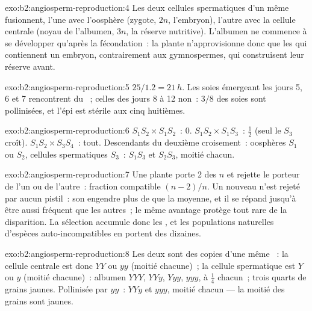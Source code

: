 \begin{solution}{exo:b2:angiosperm-reproduction:4}
Les deux cellules spermatiques d'un même  fusionnent,
l'une avec l'oosphère (zygote, $2n$, l'embryon), l'autre avec la cellule
centrale (noyau de l'albumen, $3n$, la réserve nutritive). L'albumen ne
commence à se développer qu'après la fécondation~: la plante
n'approvisionne donc que les  qui contiennent un embryon,
contrairement aux gymnospermes, qui construisent leur réserve avant.
\end{solution}

\begin{solution}{exo:b2:angiosperm-reproduction:5}
$25/1.2 = \qty{21}{h}$. Les soies émergeant les jours 5, 6 et 7
rencontrent du ~; celles des jours 8 à 12 non~: $3/8$ des soies
sont pollinisées, et l'épi est stérile aux cinq huitièmes.
\end{solution}

\begin{solution}{exo:b2:angiosperm-reproduction:6}
$S_1S_2\times S_1S_2$~: 0. $S_1S_2\times S_1S_3$~: $\tfrac12$ (seul le
 $S_3$ croît). $S_1S_2\times S_3S_4$~: tout. Descendants du
deuxième croisement~: oosphères $S_1$ ou $S_2$, cellules spermatiques
$S_3$~: $S_1S_3$ et $S_2S_3$, moitié chacun.
\end{solution}

\begin{solution}{exo:b2:angiosperm-reproduction:7}
Une plante porte 2 des $n$  et rejette le  porteur de l'un
ou de l'autre~: fraction compatible $(n - 2)/n$. Un  nouveau
n'est rejeté par aucun pistil~: son  engendre plus de  que
la moyenne, et il se répand jusqu'à être aussi fréquent que les autres~;
le même avantage protège tout  rare de la disparition. La
sélection accumule donc les , et les populations naturelles
d'espèces auto-incompatibles en portent des dizaines.
\end{solution}

\begin{solution}{exo:b2:angiosperm-reproduction:8}
Les deux  sont des copies d'une même ~: la
cellule centrale est donc $YY$ ou $yy$ (moitié chacune)~; la cellule
spermatique est $Y$ ou $y$ (moitié chacune)~: albumen $YYY$, $YYy$,
$Yyy$, $yyy$, à $\tfrac14$ chacun~; trois quarts de grains jaunes.
Pollinisée par $yy$~: $YYy$ et $yyy$, moitié chacun --- la moitié des
grains sont jaunes.
\end{solution}

